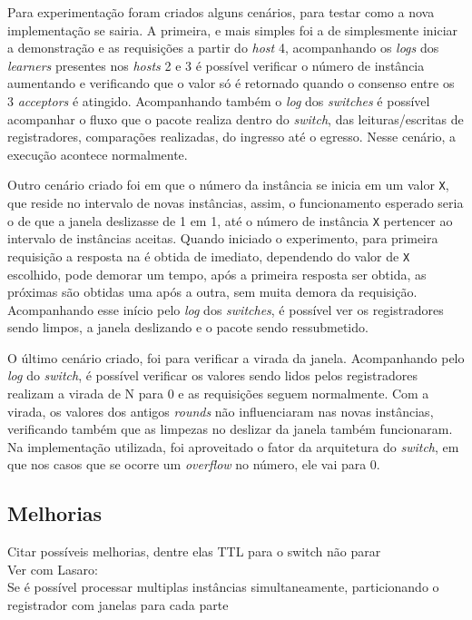 \documentclass[
    12pt,
    openright, 
    oneside,
    a4paper,
    french,
    english,
    brazil
    ]{facom-ufu-abntex2}
\theoremstyle{definition}
\begin{document}
Para experimentação foram criados alguns cenários, para testar como a nova implementação se sairia. A primeira, e mais simples
foi a de simplesmente iniciar a demonstração e as requisições a partir do \textit{host} 4, acompanhando os \textit{logs} dos
\textit{learners} presentes nos \textit{hosts} 2 e 3 é possível verificar o número de instância aumentando e verificando que 
o valor só é retornado quando o consenso entre os 3 \textit{acceptors} é atingido. Acompanhando também o \textit{log} dos
\textit{switches} é possível acompanhar o fluxo que o pacote realiza dentro do \textit{switch}, das leituras/escritas de registradores,
comparações realizadas, do ingresso até o egresso. Nesse cenário, a execução acontece normalmente.

Outro cenário criado foi em que o número da instância se inicia em um valor \texttt{X}, que reside no intervalo de novas instâncias,
assim, o funcionamento esperado seria o de que a janela deslizasse de 1 em 1, até o número de instância \texttt{X} pertencer ao intervalo
de instâncias aceitas. Quando iniciado o experimento, para primeira requisição a resposta na é obtida de imediato, dependendo do valor de
\texttt{X} escolhido, pode demorar um tempo, após a primeira resposta ser obtida, as próximas são obtidas uma após a outra, sem muita 
demora da requisição. Acompanhando esse início pelo \textit{log} dos \textit{switches}, é possível ver os registradores sendo limpos,
a janela deslizando e o pacote sendo ressubmetido.

O último cenário criado, foi para verificar a virada da janela. Acompanhando pelo \textit{log} do \textit{switch}, é possível
verificar os valores sendo lidos pelos registradores realizam a virada de N para 0 e as requisições seguem normalmente.
Com a virada, os valores dos antigos \textit{rounds} não influenciaram nas novas instâncias, verificando também que as limpezas
no deslizar da janela também funcionaram. Na implementação utilizada, foi aproveitado o fator da arquitetura do \textit{switch},
em que nos casos que se ocorre um \textit{overflow} no número, ele vai para 0.

\subsection{Melhorias}
\begin{center}
    Citar possíveis melhorias, dentre elas TTL para o switch não parar\\
    Ver com Lasaro:\\
        Se é possível processar multiplas instâncias simultaneamente, particionando o registrador com janelas para cada parte
\end{center}
\end{document}

